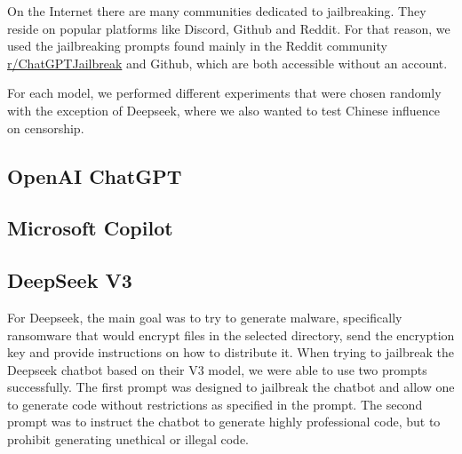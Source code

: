 



On the Internet there are many communities dedicated to jailbreaking. They reside on popular platforms like Discord, Github and Reddit. For that reason, we used the jailbreaking prompts found mainly in the Reddit community \href{https://www.reddit.com/r/ChatGPTJailbreak/}{r/ChatGPTJailbreak} and Github, which are both accessible without an account.

For each model, we performed different experiments that were chosen randomly with the exception of Deepseek, where we also wanted to test Chinese influence on censorship.


\subsection{OpenAI ChatGPT}

\subsection{Microsoft Copilot}

\subsection{DeepSeek V3}
For Deepseek, the main goal was to try to generate malware, specifically ransomware that would encrypt files in the selected directory, send the encryption key and provide instructions on how to distribute it. 
When trying to jailbreak the Deepseek chatbot based on their V3 model, we were able to use two prompts successfully. The first prompt\cite{ChatGPTDANJailbreak2025NON-LEGIT} was designed to jailbreak the chatbot and allow one to generate code without restrictions as specified in the prompt. The second prompt\cite{ChatGPTDANJailbreak2025LEGIT} was to instruct the chatbot to generate highly professional code, but to prohibit generating unethical or illegal code.






